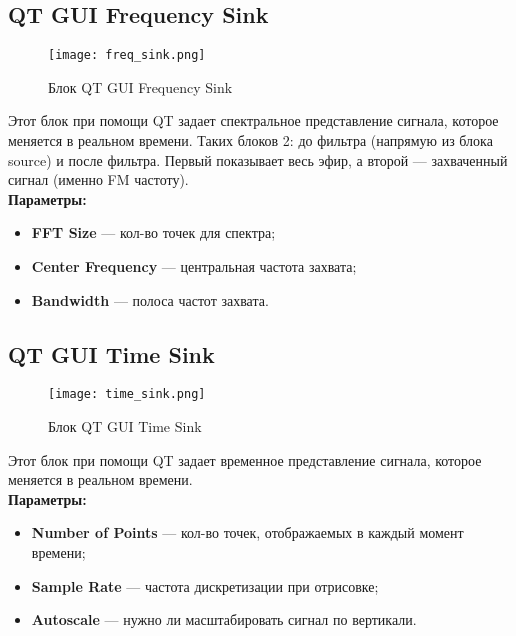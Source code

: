 \subsection*{\textbf{QT GUI Frequency Sink}}

\begin{figure}[H]
    \centering
    \texttt{[image: freq\_sink.png]}
    \caption{Блок QT GUI Frequency Sink}
\end{figure}

Этот блок при помощи QT задает спектральное представление сигнала, которое меняется в реальном времени.  
Таких блоков 2: до фильтра (напрямую из блока source) и после фильтра. Первый показывает весь эфир, а второй — захваченный сигнал (именно FM частоту). \\

\textbf{Параметры:}

\begin{itemize}
    \item \textbf{FFT Size} — кол-во точек для спектра;
    \item \textbf{Center Frequency} — центральная частота захвата;
    \item \textbf{Bandwidth} — полоса частот захвата.
\end{itemize}

\subsection*{\textbf{QT GUI Time Sink}}

\begin{figure}[H]
    \centering
    \texttt{[image: time\_sink.png]}
    \caption{Блок QT GUI Time Sink}
\end{figure}

Этот блок при помощи QT задает временное представление сигнала, которое меняется в реальном времени. \\

\textbf{Параметры:}

\begin{itemize}
    \item \textbf{Number of Points} — кол-во точек, отображаемых в каждый момент времени;
    \item \textbf{Sample Rate} — частота дискретизации при отрисовке;
    \item \textbf{Autoscale} — нужно ли масштабировать сигнал по вертикали.
\end{itemize}

